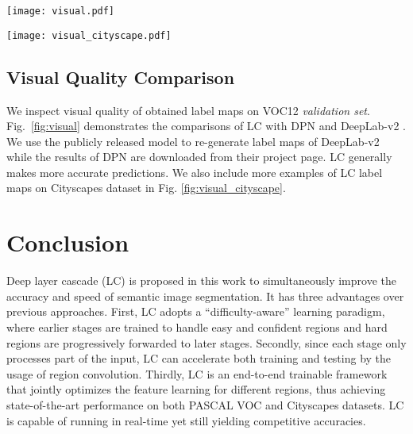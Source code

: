 \documentclass[10pt,twocolumn,letterpaper]{article}
\begin{document}
\begin{figure*}
	\centering
	\texttt{[image: visual.pdf]}
	\caption{Visual quality comparison of different methods: (a) input image (b) ground truth (c) DPN \cite{liu2015semantic} (d) DeepLab-v2 \cite{CP2016Deeplab} and (e) LC.}
	\label{fig:visual}
\end{figure*}

\begin{figure*}
	\centering
	\texttt{[image: visual\_cityscape.pdf]}
	\caption{Visual quality of LC label maps: (a) input image (b) ground truth (white labels indicating ambiguous regions) and (c) LC.}
	\label{fig:visual_cityscape}
\end{figure*}

\subsection{Visual Quality Comparison}

We inspect visual quality of obtained label maps on VOC12 \textit{validation set}.
Fig.~\ref{fig:visual} demonstrates the comparisons of LC with DPN \cite{liu2015semantic} and DeepLab-v2 \cite{CP2016Deeplab}.
We use the publicly released model to re-generate label maps of DeepLab-v2 while the results of DPN are downloaded from their project page.
LC generally makes more accurate predictions.
We also include more examples of LC label maps on Cityscapes dataset \cite{Cordts2016Cityscapes} in Fig. \ref{fig:visual_cityscape}.



 
\section{Conclusion}


Deep layer cascade (LC) is proposed in this work to simultaneously improve the accuracy and speed of semantic image segmentation.
It has three advantages over previous approaches.
First, LC adopts a ``difficulty-aware'' learning paradigm, where earlier stages are trained to handle easy and confident regions and hard regions are progressively forwarded to later stages.
Secondly, since each stage only processes part of the input, LC can accelerate both training and testing by the usage of region convolution.
Thirdly, LC is an end-to-end trainable framework that jointly optimizes the feature learning for different regions, thus achieving state-of-the-art performance on both PASCAL VOC and Cityscapes datasets.
LC is capable of running in real-time yet still yielding competitive accuracies.
 
{\small


}
\end{document}
